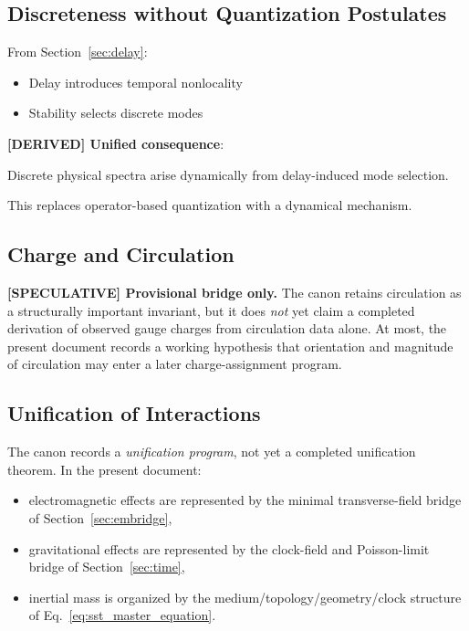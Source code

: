 \documentclass[11pt]{article}
\theoremstyle{definition}
\theoremstyle{plain}
\theoremstyle{remark}
\begin{document}
    \subsection{Discreteness without Quantization Postulates}
        
        From Section~\ref{sec:delay}:
        
        \begin{itemize}
            \item Delay introduces temporal nonlocality
            \item Stability selects discrete modes
        \end{itemize}
        
        \textbf{[DERIVED] Unified consequence}:
        \begin{center}
            Discrete physical spectra arise dynamically from delay-induced mode selection.
        \end{center}
        
        This replaces operator-based quantization with a dynamical mechanism.
    
    \subsection{Charge and Circulation}
        
        \textbf{[SPECULATIVE] Provisional bridge only.} The canon retains circulation as a structurally important invariant, but it does \emph{not} yet claim a completed derivation of observed gauge charges from circulation data alone. At most, the present document records a working hypothesis that orientation and magnitude of circulation may enter a later charge-assignment program.
    
    \subsection{Unification of Interactions}
        
        The canon records a \emph{unification program}, not yet a completed unification theorem. In the present document:
        \begin{itemize}
            \item electromagnetic effects are represented by the minimal transverse-field bridge of Section~\ref{sec:embridge},
            \item gravitational effects are represented by the clock-field and Poisson-limit bridge of Section~\ref{sec:time},
            \item inertial mass is organized by the medium/topology/geometry/clock structure of Eq.~\eqref{eq:sst_master_equation}.
        \end{itemize}
        
\end{document}
